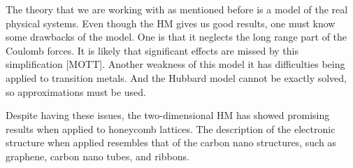 The theory that we are working with as mentioned before is a model of the real physical systems. Even though the HM gives us good results, one must know some drawbacks of the model. One is that it neglects the long range part of the Coulomb forces. It is likely that significant effects are missed by this simplification [MOTT]. Another weakness of this model it has difficulties being applied to transition metals. And the Hubbard model cannot be exactly solved, so approximations must be used.

Despite having these issues, the two-dimensional HM has showed promising results when applied to honeycomb lattices. The description of the electronic structure when applied resembles that of the carbon nano structures, such as graphene, carbon nano tubes, and ribbons.

